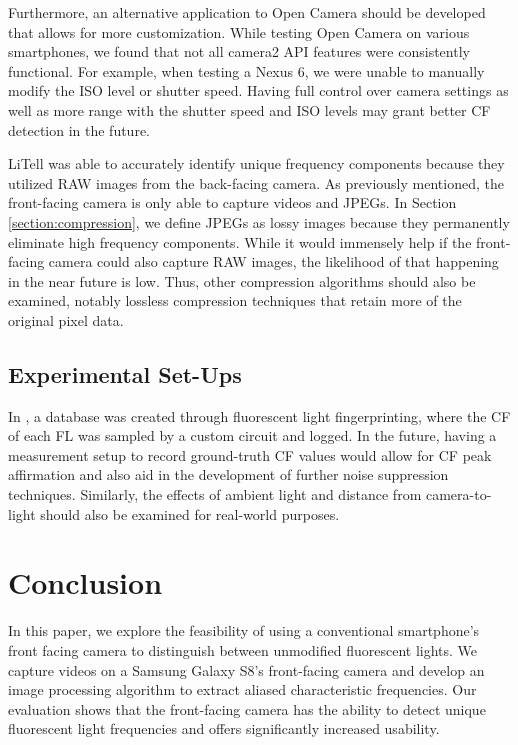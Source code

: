 \documentclass[conference]{IEEEtran}
\begin{document}
Furthermore, an alternative application to Open Camera should be developed that allows for more customization. While testing Open Camera on various smartphones, we found that not all camera2 API features were consistently functional. For example, when testing a Nexus 6, we were unable to manually modify the ISO level or shutter speed. Having full control over camera settings as well as more range with the shutter speed and ISO levels may grant better CF detection in the future.

LiTell was able to accurately identify unique frequency components because they utilized RAW images from the back-facing camera. As previously mentioned, the front-facing camera is only able to capture videos and JPEGs. In Section \ref{section:compression}, we define JPEGs as lossy images because they permanently eliminate high frequency components. While it would immensely help if the front-facing camera could also capture RAW images, the likelihood of that happening in the near future is low. Thus, other compression algorithms should also be examined, notably lossless compression techniques that retain more of the original pixel data.

\subsection{Experimental Set-Ups}

In \cite{zhang2016litell}, a database was created through fluorescent light fingerprinting, where the CF of each FL was sampled by a custom circuit and logged. In the future, having a measurement setup to record ground-truth CF values would allow for CF peak affirmation and also aid in the development of further noise suppression techniques. Similarly, the effects of ambient light and distance from camera-to-light should also be examined for real-world purposes.

\section{Conclusion}\label{section:conclusion}

In this paper, we explore the feasibility of using a conventional smartphone's front facing camera to distinguish between unmodified fluorescent lights. We capture videos on a Samsung Galaxy S8's front-facing camera and develop an image processing algorithm to extract aliased characteristic frequencies. Our evaluation shows that the front-facing camera has the ability to detect unique fluorescent light frequencies and offers significantly increased usability.
\end{document}
